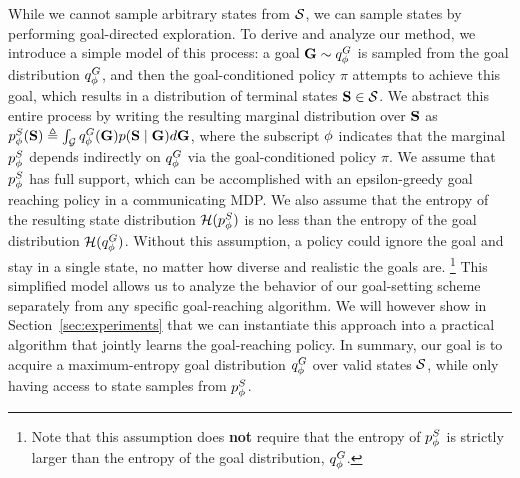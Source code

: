 While we cannot sample arbitrary states from ${\mathcal{S}}$, we can sample states by performing goal-directed exploration.
To derive and analyze our method, we introduce a simple model of this process:
a goal $\mathbf{G} \sim {q^G_{{\phi}}}$ is sampled from the goal distribution ${q^G_{{\phi}}}$, and
then the goal-conditioned policy $\pi$ attempts to achieve this goal, which results in a distribution of terminal states ${\mathbf{S}} \in {\mathcal{S}}$.
We abstract this entire process by writing the resulting marginal distribution over ${\mathbf{S}}$ as \mbox{${p^S_{{\phi}}} ({\mathbf{S}}) \triangleq \int_\mathcal{G} {q^G_{{\phi}}}(\mathbf{G}) p({\mathbf{S}} \mid \mathbf{G}) d\mathbf{G}$}, where the subscript ${\phi}$ indicates that the marginal ${p^S_{{\phi}}}$ depends indirectly on ${q^G_{{\phi}}}$ via the goal-conditioned policy $\pi$.
We assume that ${p^S_{{\phi}}}$ has full support, which can be accomplished with an epsilon-greedy goal reaching policy in a communicating MDP.
We also assume that the entropy of the resulting state distribution ${\mathcal{H}}({p^S_{{\phi}}})$ is no less than the entropy of the goal distribution ${\mathcal{H}}({q^G_{{\phi}}})$.
Without this assumption, a policy could ignore the goal and stay in a single state, no matter how diverse and realistic the goals are.
\footnote{
Note that this assumption does \textbf{not} require that the entropy of ${p^S_{{\phi}}}$ is strictly larger than the entropy of the goal distribution, ${q^G_{{\phi}}}$.
}
This simplified model allows us to analyze the behavior of our goal-setting scheme separately from any specific goal-reaching algorithm. We will however show in Section~\ref{sec:experiments} that we can instantiate this approach into a practical algorithm that jointly learns the goal-reaching policy. In summary, our goal is to acquire a maximum-entropy goal distribution ${q^G_{{\phi}}}$ over valid states ${\mathcal{S}}$, while only having access to state samples from ${p^S_{{\phi}}}$.
